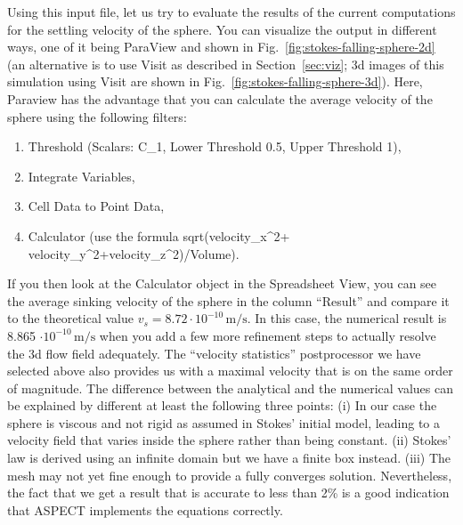 \documentclass{article}
\newcommand{\aspect}{\textsc{ASPECT}}
\begin{document}


Using this input file, let us try to evaluate the results of the current
computations for the settling velocity of the sphere. You can visualize the output in different
ways, one of it being ParaView and shown in
Fig.~\ref{fig:stokes-falling-sphere-2d} (an alternative is to use Visit as
described in Section~\ref{sec:viz}; 3d images of this simulation using Visit
are shown in Fig.~\ref{fig:stokes-falling-sphere-3d}).
Here, Paraview has the advantage that you can calculate the average velocity
of the sphere using the following filters:
\begin{enumerate}
 \item Threshold (Scalars: C\_1, Lower Threshold 0.5, Upper Threshold 1),
 \item Integrate Variables,
 \item Cell Data to Point Data,
 \item Calculator (use the formula sqrt(velocity\_x\textasciicircum2+
       velocity\_y\textasciicircum2+velocity\_z\textasciicircum2)/Volume).
\end{enumerate}
If you then look at
the Calculator object in the Spreadsheet View, you can see the average sinking
velocity of the sphere in the column ``Result'' and compare it to the theoretical
value $v_s = 8.72 \cdot 10^{-10} \, \text{m}/\text{s}$.
In this case, the numerical result is 8.865 $\cdot 10^{-10} \,
\text{m}/\text{s}$ when you add a few more refinement steps to actually resolve
the 3d flow field adequately. The ``velocity statistics'' postprocessor we have
selected above also provides us with a maximal velocity that is on the same
order of magnitude. The difference between the analytical and the numerical
values can be explained by different at least the following three points:
(i) In our case the sphere is viscous and not rigid as assumed in Stokes' initial model, leading to
a velocity field that varies inside the sphere rather than being constant.
(ii) Stokes' law is derived using an infinite domain but we have a finite box
instead. (iii) The mesh may not yet fine enough to provide a fully converges
solution. Nevertheless, the fact that we get a result that is accurate to less
than 2\% is a good indication that \aspect{} implements the equations correctly.
\end{document}
